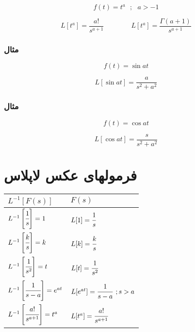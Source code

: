 \documentclass[12pt]{book}
\begin{document}
$$
f(t) = t^{a} \:\:\: ; \:\:\: a > -1
$$



\begin{tcolorbox}
$$
L[t^{a}] = \frac{a!}{s^{a+1}} \qquad \qquad L[t^{a}] = \frac{\Gamma{(a+1)}}{s^{a+1}}
$$
\end{tcolorbox}



\subsubsection{مثال}

$$
f(t) = \sin{at}
$$

\begin{tcolorbox}
$$
L[\sin{at}] = \frac{a}{s^{2} + a^{2}}
$$
\end{tcolorbox}

\subsubsection{مثال}

$$
f(t) = \cos{at}
$$

\begin{tcolorbox}
$$
L[\cos{at}] = \frac{s}{s^{2} + a^{2}}
$$
\end{tcolorbox}


\section{فرمولهای عکس لاپلاس}

\begin{latin}
\begin{center}
  \bgroup
  \def\arraystretch{3}%
  \begin{tabular}{ l | l  }
    $L^{-1}\left[ F(s) \right]$ & $F(s)$ \\
    \hline
    $L^{-1}\left[ \cfrac{1}{s} \right] = 1$ & $L[1] = \cfrac{1}{s}$ \\
    \hline
    $L^{-1}\left[ \cfrac{k}{s} \right] = k$ & $L[k] = \cfrac{k}{s}$ \\
    \hline
    $L^{-1}\left[ \cfrac{1}{s^{2}} \right] = t$ & $L[t] = \cfrac{1}{s^{2}}$ \\
    \hline
    $L^{-1}\left[ \cfrac{1}{s-a} \right] = e^{at}$ & $L[e^{at}] = \cfrac{1}{s-a} \:\: ; s > a$ \\
    \hline
    $L^{-1}\left[ \cfrac{a!}{s^{a+1}} \right] = t^{a}$ & $L[t^{a}] = \cfrac{a!}{s^{a+1}}$ \\
  \end{tabular}
  \egroup
\end{center}
\end{latin}
\end{document}
